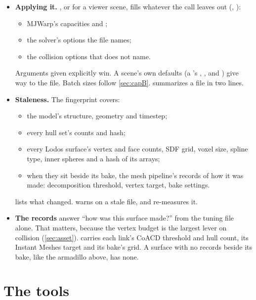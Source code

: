 \begin{itemize}
\item \textbf{Applying it.} , or  for a viewer scene, fills whatever the call leaves out (, ):
  \begin{itemize}
  \item MJWarp's capacities and ;
  \item the solver's options the file names;
  \item the collision options that  does not name.
  \end{itemize}
  Arguments given explicitly win. A scene's own defaults (a 's , ,  and ) give way to the file. Batch sizes follow \cref{sec:capB}.  summarizes a file in two lines.
\item \textbf{Staleness.} The fingerprint covers:
  \begin{itemize}
  \item the model's structure, geometry and timestep;
  \item every hull set's counts and hash;
  \item every Lodos surface's vertex and face counts, SDF grid, voxel size, spline type, inner spheres and a hash of its arrays;
  \item when they sit beside its bake, the mesh pipeline's records of how it was made: decomposition threshold, vertex target, bake settings.
  \end{itemize}
   lists what changed.  warns on a stale file, and  re-measures it.
\item \textbf{The records} answer ``how was this surface made?'' from the tuning file alone. That matters, because the vertex budget is the largest lever on collision (\cref{sec:asset}).  carries each link's CoACD threshold and hull count, its Instant Meshes target and its bake's grid. A surface with no records beside its bake, like the armadillo above, has none.
\end{itemize}

\section{The tools}\label{sec:tools}

